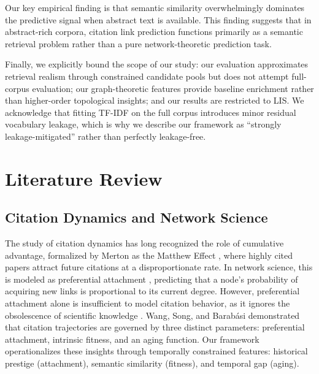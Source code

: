 \documentclass[11pt,a4paper]{article}
\begin{document}
Our key empirical finding is that semantic similarity overwhelmingly dominates the predictive signal when abstract text is available. This finding suggests that in abstract-rich corpora, citation link prediction functions primarily as a semantic retrieval problem rather than a pure network-theoretic prediction task. 

Finally, we explicitly bound the scope of our study: our evaluation approximates retrieval realism through constrained candidate pools but does not attempt full-corpus evaluation; our graph-theoretic features provide baseline enrichment rather than higher-order topological insights; and our results are restricted to LIS. We acknowledge that fitting TF-IDF on the full corpus introduces minor residual vocabulary leakage, which is why we describe our framework as ``strongly leakage-mitigated'' rather than perfectly leakage-free.

\section{Literature Review}
\label{sec:lit}

\subsection{Citation Dynamics and Network Science}
The study of citation dynamics has long recognized the role of cumulative advantage, formalized by Merton as the Matthew Effect \citep{merton1968matthew}, where highly cited papers attract future citations at a disproportionate rate. In network science, this is modeled as preferential attachment \citep{barabasi1999emergence}, predicting that a node's probability of acquiring new links is proportional to its current degree. However, preferential attachment alone is insufficient to model citation behavior, as it ignores the obsolescence of scientific knowledge \citep{price1965networks}. Wang, Song, and Barab\'asi \citep{wang2013quantifying} demonstrated that citation trajectories are governed by three distinct parameters: preferential attachment, intrinsic fitness, and an aging function. Our framework operationalizes these insights through temporally constrained features: historical prestige (attachment), semantic similarity (fitness), and temporal gap (aging).
\end{document}
